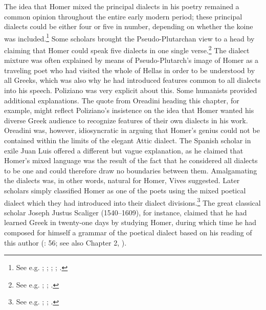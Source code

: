 The idea that Homer mixed the principal dialects in his poetry remained a common opinion throughout the entire early modern period; these principal dialects could be either four or five in number, depending on whether the koine was included.\footnote{See e.g. \citet[\textsc{aa.}i\textsc{\textsuperscript{r}}]{Simler1512}; \citet[\textsc{a}.viii\textsc{\textsuperscript{r}}]{Liburnio1546}; \citet[xxxiv]{Lancelot1655}; \citet[20-23]{Grosch1753}; \citet[196]{Ries1786}.} Some scholars brought the Pseudo-Plutarchan view to a head by claiming that Homer could speak five dialects in one single verse.\footnote{See e.g. \citet[\textit{s.u. dialecte}]{Furetiere1701}; \citet[ \textsc{i.}203 (3rd sequence of pagination)]{Chambers1728}; \citet[934]{Dumarsais1754}.} The dialect mixture was often explained by means of Pseudo-Plutarch’s image of Homer as a traveling poet who had visited the whole of Hellas in order to be understood by all Greeks, which was also why he had introduced features common to all dialects into his speech. Poliziano was very explicit about this. Some humanists provided additional explanations. The quote from Oreadini heading this chapter, for example, might reflect Poliziano’s insistence on the idea that Homer wanted his diverse Greek audience to recognize features of their own dialects in his work. Oreadini was, however, idiosyncratic in arguing that Homer’s genius could not be contained within the limits of the elegant Attic dialect. The Spanish scholar in exile Juan Luis \citet[\textsc{x}.iiii\textsc{\textsuperscript{r}}]{Vives1533} offered a different but vague explanation, as he claimed that Homer’s mixed language was the result of the fact that he considered all dialects to be one and could therefore draw no boundaries between them. Amalgamating the dialects was, in other words, natural for Homer, Vives suggested. Later scholars simply classified Homer as one of the poets using the mixed poetical dialect which they had introduced into their dialect divisions.\footnote{See e.g. \citet[6\textsc{\textsuperscript{r-v}}]{Baile1588}; \citet[333]{Alsted1630}; \citet[161]{Gesner1774}.} The great classical scholar Joseph Justus Scaliger (1540–1609), for instance, claimed that he had learned Greek in twenty-one days by studying Homer, during which time he had composed for himself a grammar of the poetical dialect based on his reading of this author (\citealt{Scaliger1594}: 56; see also Chapter 2, ).

